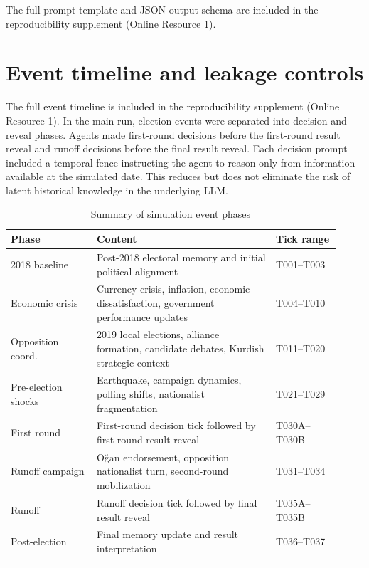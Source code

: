 \documentclass[pdflatex,sn-mathphys-num,iicol]{sn-jnl}
\begin{document}
\begin{appendices}
The full prompt template and JSON output schema are included in the
reproducibility supplement (Online Resource 1).

\section{Event timeline and leakage controls}\label{app:timeline}

The full event timeline is included in the reproducibility supplement
(Online Resource 1). In the main run, election events were separated into
decision and reveal phases. Agents made first-round decisions before the
first-round result reveal and runoff decisions before the final result reveal.
Each decision prompt included a temporal fence instructing the agent to reason
only from information available at the simulated date. This reduces but does not
eliminate the risk of latent historical knowledge in the underlying LLM.

\begin{table}[t]
\caption{Summary of simulation event phases}
\label{tab:events}
\centering\footnotesize
\begin{tabular}{@{}p{0.24\linewidth}p{0.50\linewidth}p{0.18\linewidth}@{}}
\toprule
Phase & Content & Tick range \\
\midrule
2018 baseline        & Post-2018 electoral memory and initial political
                       alignment & T001--T003 \\
Economic crisis      & Currency crisis, inflation, economic dissatisfaction,
                       government performance updates & T004--T010 \\
Opposition coord.    & 2019 local elections, alliance formation, candidate
                       debates, Kurdish strategic context & T011--T020 \\
Pre-election shocks  & Earthquake, campaign dynamics, polling shifts,
                       nationalist fragmentation & T021--T029 \\
First round          & First-round decision tick followed by first-round
                       result reveal & T030A--T030B \\
Runoff campaign      & Oğan endorsement, opposition nationalist turn,
                       second-round mobilization & T031--T034 \\
Runoff               & Runoff decision tick followed by final result reveal
                       & T035A--T035B \\
Post-election        & Final memory update and result interpretation
                       & T036--T037 \\
\botrule
\end{tabular}
\normalsize
\end{table}

\end{appendices}
\end{document}
